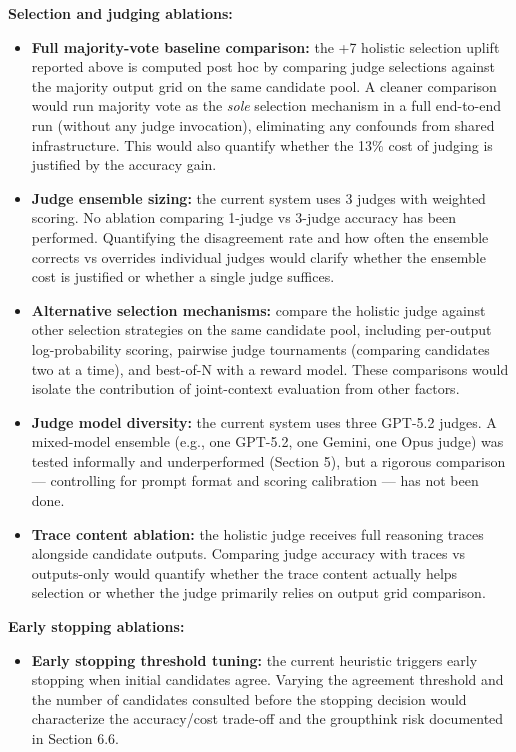 \documentclass[11pt]{article}
\providecommand{\tightlist}{%
  \setlength{\itemsep}{0pt}\setlength{\parskip}{0pt}}
\begin{document}
\textbf{Selection and judging ablations:}

\begin{itemize}
\tightlist
\item
  \textbf{Full majority-vote baseline comparison:} the +7 holistic
  selection uplift reported above is computed post hoc by comparing
  judge selections against the majority output grid on the same
  candidate pool. A cleaner comparison would run majority vote as the
  \emph{sole} selection mechanism in a full end-to-end run (without any
  judge invocation), eliminating any confounds from shared
  infrastructure. This would also quantify whether the 13\% cost of
  judging is justified by the accuracy gain.
\item
  \textbf{Judge ensemble sizing:} the current system uses 3 judges with
  weighted scoring. No ablation comparing 1-judge vs 3-judge accuracy
  has been performed. Quantifying the disagreement rate and how often
  the ensemble corrects vs overrides individual judges would clarify
  whether the ensemble cost is justified or whether a single judge
  suffices.
\item
  \textbf{Alternative selection mechanisms:} compare the holistic judge
  against other selection strategies on the same candidate pool,
  including per-output log-probability scoring, pairwise judge
  tournaments (comparing candidates two at a time), and best-of-N with a
  reward model. These comparisons would isolate the contribution of
  joint-context evaluation from other factors.
\item
  \textbf{Judge model diversity:} the current system uses three GPT-5.2
  judges. A mixed-model ensemble (e.g., one GPT-5.2, one Gemini, one
  Opus judge) was tested informally and underperformed (Section 5), but
  a rigorous comparison --- controlling for prompt format and scoring
  calibration --- has not been done.
\item
  \textbf{Trace content ablation:} the holistic judge receives full
  reasoning traces alongside candidate outputs. Comparing judge accuracy
  with traces vs outputs-only would quantify whether the trace content
  actually helps selection or whether the judge primarily relies on
  output grid comparison.
\end{itemize}

\textbf{Early stopping ablations:}

\begin{itemize}
\tightlist
\item
  \textbf{Early stopping threshold tuning:} the current heuristic
  triggers early stopping when initial candidates agree. Varying the
  agreement threshold and the number of candidates consulted before the
  stopping decision would characterize the accuracy/cost trade-off and
  the groupthink risk documented in Section 6.6.
\end{itemize}
\end{document}
